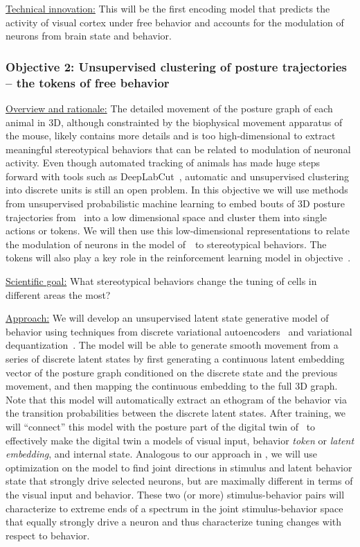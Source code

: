 \documentclass[COG,11pt]{ercgrant}
\begin{document}
   
\underline{Technical innovation:} This will be the first encoding model that predicts the activity of visual cortex under free behavior and accounts for the modulation of neurons from brain state and behavior. 


\subsubsection{Objective 2: Unsupervised clustering of posture trajectories -- the tokens of free behavior\hfill{}}
\underline{Overview and rationale:} 
The detailed movement of the posture graph of each animal in 3D, although constrainted by the biophysical movement apparatus of the mouse, likely contains more details and is too high-dimensional to extract meaningful stereotypical behaviors that can be related to modulation of neuronal activity. 
Even though automated tracking of animals has made huge steps forward with tools such as DeepLabCut~\parencite{Mathis2018-lk, Schneider2022-qf}, automatic and unsupervised clustering into discrete units is still an open problem. 
In this objective we will use methods from unsupervised probabilistic machine learning to embed bouts of 3D posture trajectories from \obji~into a low dimensional space and cluster them into single actions or tokens. 
We will then use this low-dimensional representations to relate the modulation of neurons in the model of~\obji~to stereotypical behaviors. 
The tokens will also play a key role in the reinforcement learning model in objective~\objiii.

\underline{Scientific goal:} What stereotypical behaviors change the tuning of cells in different areas the most?

\underline{Approach:}
We will develop an unsupervised latent state generative model of behavior using techniques from discrete variational autoencoders~\parencite{Child2022-fw} and variational dequantization~\parencite{Hoogeboom2021-zs}. 
The model will be able to generate smooth movement from a series of discrete latent states by first generating a continuous latent embedding vector of the posture graph conditioned on the discrete state and the previous movement, and then mapping the continuous embedding to the full 3D graph. 
Note that this model will automatically extract an ethogram of the behavior via the transition probabilities between the discrete latent states. 
After training, we will ``connect'' this model with the posture part of the digital twin of \obji~to effectively make the digital twin a models of visual input, behavior \textit{token} or \textit{latent embedding}, and internal state. 
Analogous to our approach in \textcite{Franke2022-do}, we will use optimization on the model to find joint directions in stimulus and latent behavior state that strongly drive selected neurons, but are maximally different in terms of the visual input and behavior. 
These two (or more) stimulus-behavior pairs will characterize to extreme ends of a spectrum in the joint stimulus-behavior space that equally strongly drive a neuron and thus characterize tuning changes with respect to behavior. 
\end{document}
